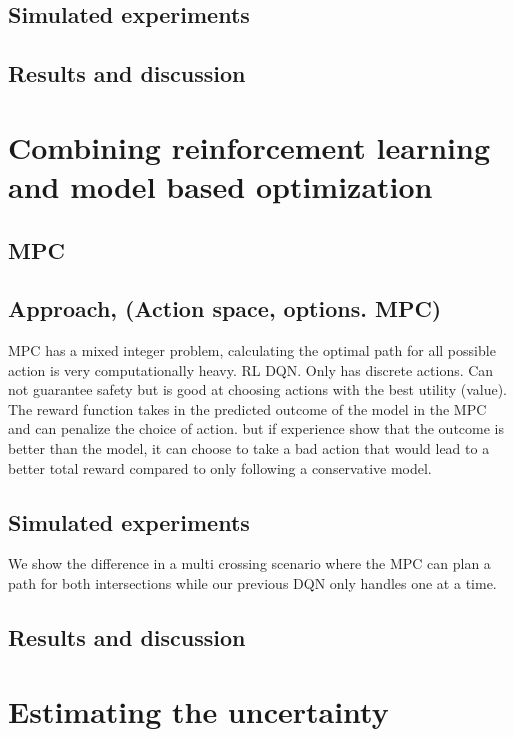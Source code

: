 \section{Simulated experiments}
\section{Results and discussion}

\chapter{Combining reinforcement learning and model based optimization}
\section{MPC}

\section{Approach, (Action space, options. MPC)}
MPC has a mixed integer problem, calculating the optimal path for all possible action is very computationally heavy. 
RL DQN. Only has discrete actions. Can not guarantee safety but is good at choosing actions with the best utility (value). 
The reward function takes in the predicted outcome of the model in the MPC and can penalize the choice of action. but if experience show that the outcome is better than the model, it can choose to take a bad action that would lead to a better total reward compared to only following a conservative model. 


\section{Simulated experiments}
We show the difference in a multi crossing scenario where the MPC can plan a path for both intersections while our previous DQN only handles one at a time. 

\section{Results and discussion}

\chapter{Estimating the uncertainty}


